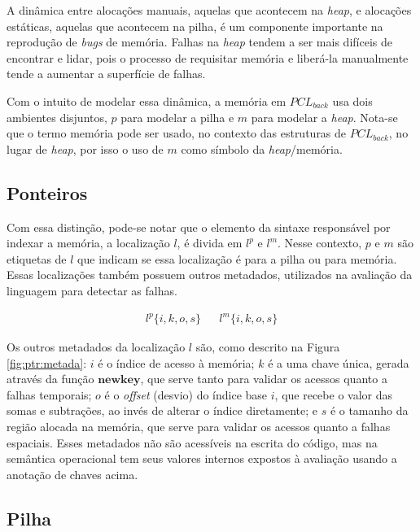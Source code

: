 A dinâmica entre alocações manuais, aquelas que acontecem na \emph{heap}, e alocações estáticas, aquelas que acontecem na pilha, é um componente importante na reprodução de \emph{bugs} de memória. Falhas na \emph{heap} tendem a ser mais difíceis de encontrar e lidar, pois o processo de requisitar memória e liberá-la manualmente tende a aumentar a superfície de falhas. 

Com o intuito de modelar essa dinâmica, a memória em $PCL_{back}$ usa dois ambientes disjuntos, $p$ para modelar a pilha e $m$ para modelar a \emph{heap}. Nota-se que o termo memória pode ser usado, no contexto das estruturas de $PCL_{back}$, no lugar de \emph{heap}, por isso o uso de $m$ como símbolo da \emph{heap}/memória.

\subsection{Ponteiros}
\label{sec:pcl-back:ptr}

Com essa distinção, pode-se notar que o elemento da sintaxe responsável por indexar a memória, a localização $l$, é divida em $l^p$ e $l^m$. Nesse contexto, $p$ e $m$ são etiquetas de $l$ que indicam se essa localização é para a pilha ou para memória. Essas localizações também possuem outros metadados, utilizados na avaliação da linguagem para detectar as falhas. 

\begin{figure*}[ht]
	\begin{align*}
		l^p\{i, k, o, s \} && l^m\{i, k, o, s \}
	\end{align*}
	\caption{\emph{Layout} dos metadados dos locais.}
	\label{fig:ptr:metada}
\end{figure*}

Os outros metadados da localização $l$ são, como descrito na Figura \ref{fig:ptr:metada}: $i$ é o índice de acesso à memória; $k$ é a uma chave única, gerada através da função $\mathbf{newkey}$, que serve tanto para validar os acessos quanto a falhas temporais; $o$ é o \emph{offset} (desvio) do índice base $i$, que recebe o valor das somas e subtrações, ao invés de alterar o índice diretamente; e $s$ é o tamanho da região alocada na memória, que serve para validar os acessos quanto a falhas espaciais. Esses metadados não são acessíveis na escrita do código, mas na semântica operacional tem seus valores internos expostos à avaliação usando a anotação de chaves acima.

\subsection{Pilha}
\label{sec:pcl-back:pilha}

